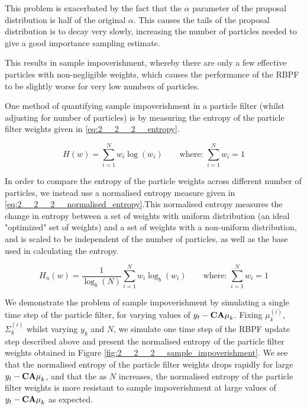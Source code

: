 \documentclass[../main.tex]{subfiles}
\begin{document}
This problem is exacerbated by the fact that the $\alpha$ parameter of the proposal distribution is half of the original $\alpha$. This causes the tails of the proposal distribution is to decay very slowly, increasing the number of particles needed to give a good importance sampling estimate. 

This results in sample impoverishment, whereby there are only a few effective particles with non-negligible weights, which causes the performance of the RBPF to be slightly worse for very low numbers of particles. 

One method of quantifying sample impoverishment in a particle filter (whilst adjusting for number of particles) is by measuring the entropy of the particle filter weights given in \autoref{eq:2__2__2__entropy}. 

\begin{equation}
	H(w) = \sum_{i=1}^N w_i \log(w_i)  \qquad \text{where: } \sum_{i=1}^N w_i = 1 \label{eq:2__2__2__entropy}
\end{equation}

In order to compare the entropy of the particle weights across different number of particles, we instead use a normalised entropy measure given in \autoref{eq:2__2__2__normalised_entropy}.This normalised entropy measures the change in entropy between a set of weights with uniform distribution (an ideal "optimized" set of weights) and a set of weights with a non-uniform distribution, and is scaled to be independent of the number of particles, as well as the base used in calculating the entropy.

\begin{equation}
H_n(w) = \frac{1}{\log_b(N)}\sum_{i=1}^N w_i \log_b(w_i)  \qquad \text{where: } \sum_{i=1}^N w_i = 1   \label{eq:2__2__2__normalised_entropy}
\end{equation}

We demonstrate the problem of sample impoverishment by simulating a single time step of the particle filter, for varying values of $y_t - {\bf CA\mu}_k$. Fixing $\mu_k^{(i)}$, $\Sigma_k^{(i)}$ whilst varying $y_k$ and $N$, we simulate one time step of the RBPF update step described above and present the normalised entropy of the particle filter weights obtained in Figure \ref{fig:2__2__2__sample_impoverishment}. We see that the normalised entropy of the particle filter weights drops rapidly for large $y_t - {\bf CA\mu}_k$, and that the as $N$ increases, the normalised entropy of the particle filter weights is more resistant to sample impoverishment at large values of $y_t - {\bf CA\mu}_k$ as expected. 
\end{document}
